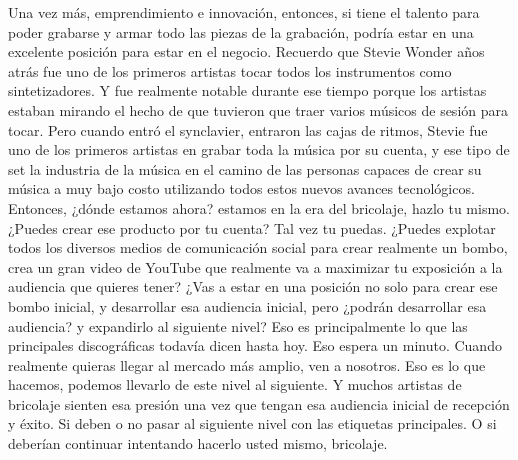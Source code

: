 \documentclass[10pt]{book}
\begin{document}
Una vez más, emprendimiento e innovación, entonces, si tiene el talento para poder grabarse y armar todo las piezas de la grabación, podría estar en una excelente posición para estar en el negocio. Recuerdo que Stevie Wonder años atrás fue uno de los primeros artistas tocar todos los instrumentos como sintetizadores. Y fue realmente notable durante ese tiempo porque los artistas estaban mirando el hecho de que tuvieron que traer varios músicos de sesión para tocar. Pero cuando entró el synclavier, entraron las cajas de ritmos, Stevie fue uno de los primeros artistas en grabar toda la música por su cuenta, y ese tipo de set la industria de la música en el camino de las personas capaces de crear su música a muy bajo costo utilizando todos estos nuevos avances tecnológicos. Entonces, ¿dónde estamos ahora? estamos en la era del bricolaje, hazlo tu mismo. ¿Puedes crear ese producto por tu cuenta? Tal vez tu puedas. ¿Puedes explotar todos los diversos medios de comunicación social para crear realmente un bombo, crea un gran video de YouTube que realmente va a maximizar tu exposición a la audiencia que quieres tener? ¿Vas a estar en una posición no solo para crear ese bombo inicial, y desarrollar esa audiencia inicial, pero ¿podrán desarrollar esa audiencia? y expandirlo al siguiente nivel? Eso es principalmente lo que las principales discográficas todavía dicen hasta hoy. Eso espera un minuto. Cuando realmente quieras llegar al mercado más amplio, ven a nosotros. Eso es lo que hacemos, podemos llevarlo de este nivel al siguiente. Y muchos artistas de bricolaje sienten esa presión una vez que tengan esa audiencia inicial de recepción y éxito. Si deben o no pasar al siguiente nivel con las etiquetas principales. O si deberían continuar intentando hacerlo usted mismo, bricolaje.\\
\end{document}
